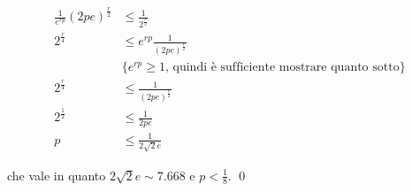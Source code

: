 \begin{proof*}
    \begin{align}
        \frac{1}{e^{rp}}(2pe)^{\frac{r}{2}} &\le \frac{1}{2^{\frac{r}{2}}} \nonumber \\
        2^{\frac{r}{4}} &\le e^{rp} \frac{1}{(2pe)^{\frac{r}{2}}} \nonumber \\
        & \{e^{rp} \ge 1 \mbox{, quindi è sufficiente mostrare quanto sotto}\} \nonumber \\
        2^{\frac{r}{4}} &\le \frac{1}{(2pe)^{\frac{r}{2}}} \nonumber \\
        2^{\frac{1}{2}} &\le \frac{1}{2pe} \nonumber \\
        p &\le \frac{1}{2\sqrt{2}e} \nonumber
    \end{align}

    che vale in quanto $2\sqrt{2}e\sim 7.668$ e $p < \frac{1}{8}$. \qed
\end{proof*}